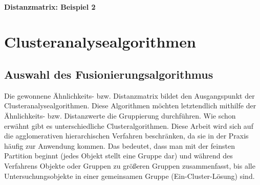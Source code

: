 \documentclass[12pt,titlepage]{article}
\begin{document}
\begin{scriptsize}
\centerline{ \\
}
\end{scriptsize} 
\centerline{\textbf{Distanzmatrix: Beispiel 2}}
\centerline{}







		

	\section{Clusteranalysealgorithmen}
		\subsection{Auswahl des Fusionierungsalgorithmus}
			Die gewonnene Ähnlichkeits- bzw. Distanzmatrix bildet den Ausgangspunkt der Clusteranalysealgorithmen. Diese Algorithmen möchten letztendlich mithilfe der Ähnlichkeits- bzw. Distanzwerte die Gruppierung durchführen. Wie schon erwähnt gibt es unterschiedliche Clusteralgorithmen. Diese Arbeit wird sich auf die agglomerativen hierarchischen Verfahren beschränken, da sie in der Praxis häufig zur Anwendung kommen. Das bedeutet, dass man mit der feinsten Partition beginnt (jedes Objekt stellt eine Gruppe dar) und während des Verfahrens Objekte oder Gruppen zu größeren Gruppen zusammenfasst, bis alle Untersuchungsobjekte in einer gemeinsamen Gruppe (Ein-Cluster-Lösung) sind.
\end{document}
